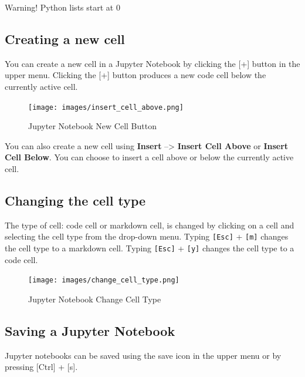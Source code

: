 \documentclass{book}
\begin{document}
Warning! Python lists start at 0
    




    
        \subsection{Creating a new cell}\label{creating-a-new-cell}

You can create a new cell in a Jupyter Notebook by clicking the {[}+{]}
button in the upper menu. Clicking the {[}+{]} button produces a new
code cell below the currently active cell.

\begin{figure}
\centering
\texttt{[image: images/insert\_cell\_above.png]}
\caption{Jupyter Notebook New Cell Button}
\end{figure}

You can also create a new cell using \textbf{Insert} --\textgreater{}
\textbf{Insert Cell Above} or \textbf{Insert Cell Below}. You can choose
to insert a cell above or below the currently active cell.
    




    
        \subsection{Changing the cell type}\label{changing-the-cell-type}

The type of cell: code cell or markdown cell, is changed by clicking on
a cell and selecting the cell type from the drop-down menu. Typing
\lstinline![Esc]! + \lstinline![m]! changes the cell type to a markdown
cell. Typing \lstinline![Esc]! + \lstinline![y]! changes the cell type
to a code cell.

\begin{figure}
\centering
\texttt{[image: images/change\_cell\_type.png]}
\caption{Jupyter Notebook Change Cell Type}
\end{figure}
    




    
        \subsection{Saving a Jupyter Notebook}\label{saving-a-jupyter-notebook}

Jupyter notebooks can be saved using the save icon in the upper menu or
by pressing {[}Ctrl{]} + {[}s{]}.
\end{document}
